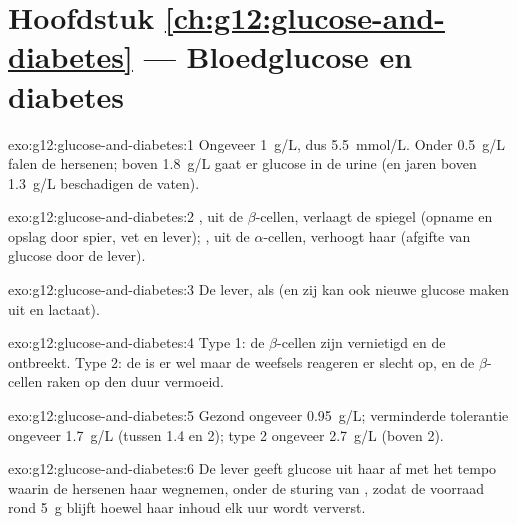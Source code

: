 \section*{Hoofdstuk \ref{ch:g12:glucose-and-diabetes} --- Bloedglucose en diabetes}

\begin{solution}{exo:g12:glucose-and-diabetes:1}
Ongeveer \qty{1}{g/L}, dus \qty{5.5}{mmol/L}. Onder \qty{0.5}{g/L} falen
de hersenen; boven \qty{1.8}{g/L} gaat er glucose in de urine (en jaren
boven \qty{1.3}{g/L} beschadigen de vaten).
\end{solution}

\begin{solution}{exo:g12:glucose-and-diabetes:2}
, uit de $\beta$-cellen, verlaagt de spiegel (opname en opslag
door spier, vet en lever); , uit de $\alpha$-cellen, verhoogt haar
(afgifte van glucose door de lever).
\end{solution}

\begin{solution}{exo:g12:glucose-and-diabetes:3}
De lever, als  (en zij kan ook nieuwe glucose maken uit
 en lactaat).
\end{solution}

\begin{solution}{exo:g12:glucose-and-diabetes:4}
Type 1: de $\beta$-cellen zijn vernietigd en de  ontbreekt. Type
2: de  is er wel maar de weefsels reageren er slecht op, en de
$\beta$-cellen raken op den duur vermoeid.
\end{solution}

\begin{solution}{exo:g12:glucose-and-diabetes:5}
Gezond ongeveer \qty{0.95}{g/L}; verminderde tolerantie ongeveer
\qty{1.7}{g/L} (tussen 1.4 en 2); type 2 ongeveer \qty{2.7}{g/L} (boven 2).
\end{solution}

\begin{solution}{exo:g12:glucose-and-diabetes:6}
De lever geeft glucose uit haar  af met het tempo waarin de
hersenen haar wegnemen, onder de sturing van , zodat de voorraad
rond \qty{5}{g} blijft hoewel haar inhoud elk uur wordt ververst.
\end{solution}

